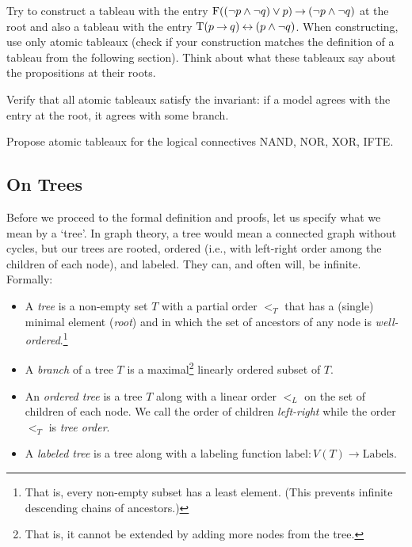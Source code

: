 \begin{exercise}\label{exercise:construct-tableaux}
    Try to construct a tableau with the entry $\mathrm{F}((\neg p \land \neg q) \lor p) \mathbin{\rightarrow} (\neg p \land \neg q)$ at the root and also a tableau with the entry $\mathrm{T}(p \mathbin{\rightarrow} q) \mathbin{\leftrightarrow} (p \land \neg q)$. When constructing, use only atomic tableaux (check if your construction matches the definition of a tableau from the following section). Think about what these tableaux say about the propositions at their roots.
\end{exercise}

\begin{exercise}
Verify that all atomic tableaux satisfy the invariant: if a model agrees with the entry at the root, it agrees with some branch.
\end{exercise}

\begin{exercise}
Propose atomic tableaux for the logical connectives NAND, NOR, XOR, IFTE.
\end{exercise}

\subsection{On Trees}
Before we proceed to the formal definition and proofs, let us specify what we mean by a `tree'. In graph theory, a tree would mean a connected graph without cycles, but our trees are rooted, ordered (i.e., with left-right order among the children of each node), and labeled. They can, and often will, be infinite. Formally:

\begin{definition}[Tree]
\begin{itemize}
\item A \emph{tree} is a non-empty set $T$ with a partial order $<_T$ that has a (single) minimal element (\emph{root}) and in which the set of ancestors of any node is \emph{well-ordered}.\footnote{That is, every non-empty subset has a least element. (This prevents infinite descending chains of ancestors.)}
\item A \emph{branch} of a tree $T$ is a maximal\footnote{That is, it cannot be extended by adding more nodes from the tree.} linearly ordered subset of $T$.
\item An \emph{ordered tree} is a tree $T$ along with a linear order $<_L$ on the set of children of each node. We call the order of children \emph{left-right} while the order $<_T$ is \emph{tree order}.
\item A \emph{labeled tree} is a tree along with a labeling function $\mathrm{label}\colon V(T) \to \mathrm{Labels}$.
\end{itemize}
\end{definition}

